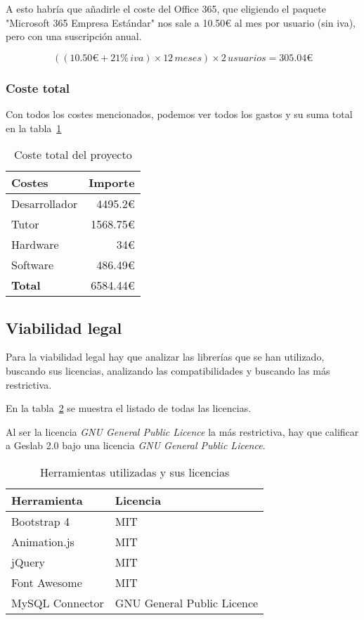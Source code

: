 A esto habría que añadirle el coste del Office 365, que eligiendo el paquete "Microsoft 365 Empresa Estándar" nos sale a 10.50€ al mes por usuario (sin iva), pero con una suscripción anual.

\[ ((10.50 \euro + 21\% \, iva) \times 12\, meses) \times 2\, usuarios = 305.04 \euro\]

\subsubsection{Coste total}

Con todos los costes mencionados, podemos ver todos los gastos y su suma total en la tabla~\ref{tabla:costes}

\begin{table}[h]
	\centering
	\caption{Coste total del proyecto}
	\label{tabla:costes}
	\begin{tabular}{p{6cm} r}
		\toprule
		Costes & Importe \\ \midrule
		Desarrollador			     & 4495.2\euro   						\\
		Tutor  				         & 1568.75\euro							\\
		Hardware				     & 34\euro								\\
		Software 				     & 486.49\euro 							\\
		\textbf{Total} 			     & 6584.44\euro 						\\  
		\bottomrule
	\end{tabular}
\end{table}


\subsection{Viabilidad legal}
 Para la viabilidad legal hay que analizar las librerías que se han utilizado, buscando sus licencias, analizando las compatibilidades y buscando las más restrictiva.
 
En la tabla~\ref{tabla:licencias} se muestra el listado de todas las licencias.

Al ser la licencia \textit{GNU General Public Licence} la más restrictiva, hay que calificar a Geslab 2.0 bajo una licencia \textit{GNU General Public Licence}.

\begin{table}[h]
	\centering
	\caption{Herramientas utilizadas y sus licencias}
	\label{tabla:licencias}
	\begin{tabular}{p{4cm} p{6cm}}
		\toprule
		Herramienta & Licencia \\ \midrule
		Bootstrap 4				     & MIT   								\\
		Animation.js		         & MIT   								\\
		jQuery				         & MIT   								\\
		Font Awesome			     & MIT 									\\ 
		MySQL Connector				 & GNU General Public Licence			\\ \bottomrule
	\end{tabular}
\end{table}


